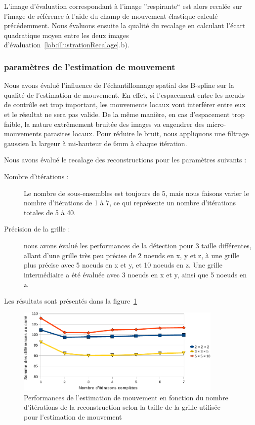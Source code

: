 L'image d'évaluation correspondant à l'image ''respirante`` est alors recalée sur l'image de référence à l'aide du champ de mouvement élastique calculé précédemment. Nous évaluons ensuite la qualité du recalage en calculant l'écart quadratique moyen entre les deux images d'évaluation~\ref{lab:illustrationRecalage}.b).

\subsubsection{paramètres de l'estimation de mouvement}

Nous avons évalué l'influence de l'échantillonnage spatial des B-spline sur la qualité de l'estimation de mouvement. En effet, si l'espacement entre les nœuds de contrôle est trop important, les mouvements locaux vont interférer entre eux et le résultat ne sera pas valide. De la même manière, en cas d'espacement trop faible, la nature extrêmement bruitée des images va engendrer des micro-mouvements parasites locaux. Pour réduire le bruit, nous appliquons une filtrage gaussien la largeur à mi-hauteur de 6mm à chaque itération.

Nous avons évalué le recalage des reconstructions pour les paramètres suivants :
\begin{description}
 \item[Nombre d'itérations :] Le nombre de sous-ensembles est toujours de 5, mais nous faisons varier le nombre d'itérations de 1 à 7, ce qui représente un nombre d'itérations totales de 5 à 40.
 \item[Précision de la grille :] nous avons évalué les performances de la détection pour 3 taille différentes, allant d'une grille très peu précise de 2 noeuds en x, y et z, à une grille plus précise avec 5 noeuds en x et y, et 10 noeuds en z. Une grille intermédiaire a été évaluée avec 3 noeuds en x et y, ainsi que 5 noeuds en z.
\end{description}

Les résultats sont présentés dans la figure~\ref{fig:perfsFctIterTaille}

\begin{figure}
\centering
\includegraphics[width=10cm]{images/perfsRecalageFctIter-grid_crop}
\caption[Performances de l'estimation de mouvement en fonction de la taille de la grille de recherche]{Performances de l'estimation de mouvement en fonction du nombre d'itérations de la reconstruction selon la taille de la grille utilisée pour l'estimation de mouvement}
\label{fig:perfsFctIterTaille}
\end{figure}

